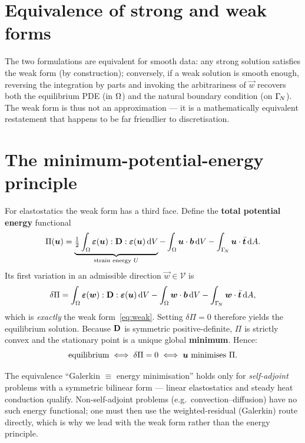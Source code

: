 \section{Equivalence of strong and weak forms}

The two formulations are equivalent for smooth data: any strong solution
satisfies the weak form (by construction); conversely, if a weak solution
is smooth enough, reversing the integration by parts and invoking the
arbitrariness of $\vec w$ recovers both the equilibrium PDE (in
$\Omega$) and the natural boundary condition (on $\Gamma_{\!N}$). The weak
form is thus not an approximation --- it is a mathematically equivalent
restatement that happens to be far friendlier to discretisation.

\section{The minimum-potential-energy principle}

For elastostatics the weak form has a third face. Define the
\textbf{total potential energy} functional
\begin{equation}
  \Pi(\bm{u}) = \underbrace{\tfrac12\int_\Omega \bm{\varepsilon}(\bm{u}):\mathbf{D}:\bm{\varepsilon}(\bm{u})\,\mathrm{d} V}_{\text{strain energy }U}
   - \int_\Omega \bm{u}\cdot\bm{b}\,\mathrm{d} V - \int_{\Gamma_{\!N}}\bm{u}\cdot\bar{\bm{t}}\,\mathrm{d} A .
  \label{eq:potential}
\end{equation}
Its first variation in an admissible direction $\vec w\in\mathcal V$ is
\begin{equation}
  \delta\Pi = \int_\Omega \bm{\varepsilon}(\bm{w}):\mathbf{D}:\bm{\varepsilon}(\bm{u})\,\mathrm{d} V
   - \int_\Omega \bm{w}\cdot\bm{b}\,\mathrm{d} V - \int_{\Gamma_{\!N}}\bm{w}\cdot\bar{\bm{t}}\,\mathrm{d} A,
\end{equation}
which is \emph{exactly} the weak form~\eqref{eq:weak}. Setting
$\delta\Pi=0$ therefore yields the equilibrium solution. Because
$\mathbf{D}$ is symmetric positive-definite, $\Pi$ is strictly convex and the
stationary point is a unique global \textbf{minimum}. Hence:
\begin{equation}
  \text{equilibrium} \iff \delta\Pi=0 \iff \bm{u} \text{ minimises } \Pi .
\end{equation}

\begin{remark}
The equivalence ``Galerkin $\equiv$ energy minimisation'' holds only for
\emph{self-adjoint} problems with a symmetric bilinear form --- linear
elastostatics and steady heat conduction qualify. Non-self-adjoint
problems (e.g.\ convection--diffusion) have no such energy functional; one
must then use the weighted-residual (Galerkin) route directly, which is
why we lead with the weak form rather than the energy principle.
\end{remark}

